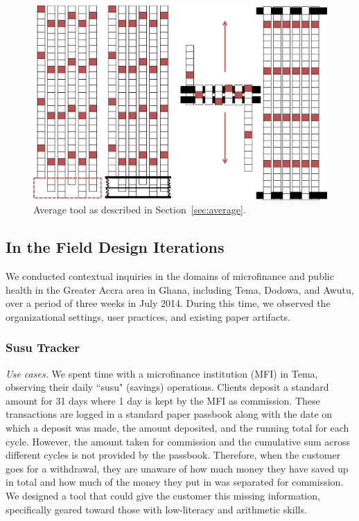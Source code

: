 \documentclass{sig-alternate}
\begin{document}
\begin{figure}
\centering
\includegraphics[width=\linewidth]{img/average.png}
\caption{Average tool as described in Section~\ref{sec:average}.}
\label{fig:average}
\end{figure}

\subsection{In the Field Design Iterations}
\label{sec:field}

We conducted contextual inquiries in the domains of microfinance and public health in the Greater Accra area in Ghana, including Tema, Dodowa, and Awutu, over a period of three weeks in July 2014. During this time, we observed the organizational settings, user practices, and existing paper artifacts. 

\subsubsection{Susu Tracker}
\label{sec:susu}

\emph{Use cases.}
We spent time with a microfinance institution (MFI) in Tema, observing their daily ``susu" (savings) operations. Clients deposit a standard amount for 31 days where 1 day is kept by the MFI as commission. These transactions are logged in a standard paper passbook along with the date on which a deposit was made, the amount deposited, and the running total for each cycle. However, the amount taken for commission and the cumulative sum across different cycles is not provided by the passbook. Therefore, when the customer goes for a withdrawal, they are unaware of how much money they have saved up in total and how much of the money they put in was separated for commission. We designed a tool that could give the customer this missing information, specifically geared toward those with low-literacy and arithmetic skills.
\end{document}
